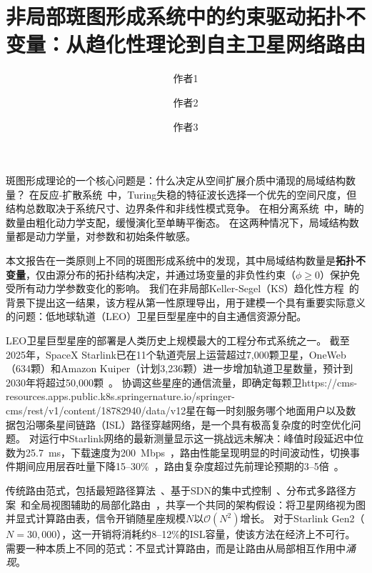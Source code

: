 \documentclass[sn-nature,pdflatex]{sn-jnl}
\title{非局部斑图形成系统中的约束驱动拓扑不变量：从趋化性理论到自主卫星网络路由}
\author[1,*]{作者1}
\author[2]{作者2}
\author[1]{作者3}
\affil[1]{[单位]物理系，[城市]，[国家]}
\affil[2]{[单位]通信工程学院，[城市]，[国家]}
\affil[*]{通讯作者: [email]@[institution].edu}
\begin{document}
\maketitle


斑图形成理论的一个核心问题是：什么决定从空间扩展介质中涌现的局域结构数量？
在反应-扩散系统~\cite{turing_1952,gierer_meinhardt_1972,cross_hohenberg_1993}中，Turing失稳的特征波长选择一个优先的空间尺度，但结构总数取决于系统尺寸、边界条件和非线性模式竞争。
在相分离系统~\cite{chaikin_lubensky_1995}中，畴的数量由粗化动力学支配，缓慢演化至单畴平衡态。
在这两种情况下，局域结构数量都是动力学量，对参数和初始条件敏感。

本文报告在一类原则上不同的斑图形成系统中的发现，其中局域结构数量是\textbf{拓扑不变量}，仅由源分布的拓扑结构决定，并通过场变量的非负性约束（$\phi \ge 0$）保护免受所有动力学参数变化的影响。
我们在非局部Keller-Segel（KS）趋化性方程~\cite{keller_segel_1970,keller_segel_1971,patlak_1953}的背景下提出这一结果，该方程从第一性原理导出，用于建模一个具有重要实际意义的问题：低地球轨道（LEO）卫星巨型星座中的自主通信资源分配。

LEO卫星巨型星座的部署是人类历史上规模最大的工程分布式系统之一。
截至2025年，SpaceX Starlink已在11个轨道壳层上运营超过7,000颗卫星，OneWeb（634颗）和Amazon Kuiper（计划3,236颗）进一步增加轨道卫星数量，预计到2030年将超过50,000颗~\cite{handley_2018,del_portillo_2019}。
协调这些星座的通信流量，即确定每颗卫https://cms-resources.apps.public.k8s.springernature.io/springer-cms/rest/v1/content/18782940/data/v12星在每一时刻服务哪个地面用户以及数据包沿哪条星间链路（ISL）路径穿越网络，是一个具有极高复杂度的时空优化问题。
对运行中Starlink网络的最新测量显示这一挑战远未解决：峰值时段延迟中位数为25.7~ms，下载速度为200~Mbps~\cite{starlink_2025_update}，路由性能呈现明显的时间波动性，切换事件期间应用层吞吐量下降15--30\%~\cite{ma_2023_infocom,mohan_2024_www}，路由复杂度超过先前理论预期的3--5倍~\cite{izhikevich_2024_sigmetrics}。

传统路由范式，包括最短路径算法~\cite{chen_2024_jsac}、基于SDN的集中式控制~\cite{roth_2025_idlb,papa_2020}、分布式多路径方案~\cite{li_2025_tmc}和全局视图辅助的局部化路由~\cite{yan_2024_galor}，共享一个共同的架构假设：将卫星网络视为图并显式计算路由表，信令开销随星座规模$N$以$\mathcal{O}(N^2)$增长。
对于Starlink Gen2（$N = 30,000$），这一开销将消耗约8--12\%的ISL容量，使该方法在经济上不可行。
需要一种本质上不同的范式：不显式计算路由，而是让路由从局部相互作用中{\it 涌现}。
\end{document}
